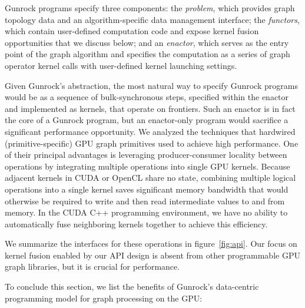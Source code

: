 \documentclass[format=acmsmall,review=false,screen=true]{acmart}
\begin{document}
Gunrock programs specify three components: the \emph{problem}, which
provides graph topology data and an algorithm-specific data management
interface; the \emph{functors}, which contain user-defined computation
code and expose kernel fusion opportunities that we discuss below; and
an \emph{enactor}, which serves as the entry point of the graph
algorithm and specifies the computation as a series of graph operator
kernel calls with user-defined kernel launching settings.

Given Gunrock's abstraction, the most natural way to specify Gunrock
programs would be as a sequence of bulk-synchronous steps, specified
within the enactor and implemented as kernels, that operate on
frontiers. Such an enactor is in fact the core of a Gunrock program,
but an enactor-only program would sacrifice a significant performance
opportunity. We analyzed the techniques that hardwired
(primitive-specific) GPU graph primitives used to achieve high
performance. One of their principal advantages is leveraging
producer-consumer locality between operations by integrating multiple
operations into single GPU kernels. Because adjacent kernels in CUDA
or OpenCL share no state, combining multiple logical operations into a
single kernel saves significant memory bandwidth that would otherwise
be required to write and then read intermediate values to and from
memory. In the CUDA C++ programming environment, we have no ability to
automatically fuse neighboring kernels together to achieve this
efficiency.

We summarize the interfaces for these operations in
figure~\ref{fig:api}. Our focus on kernel fusion enabled by our API
design is absent from other programmable GPU graph libraries, but it
is crucial for performance.

To conclude this section, we list the benefits of Gunrock's
data-centric programming model for graph processing on the GPU\@:
\end{document}
